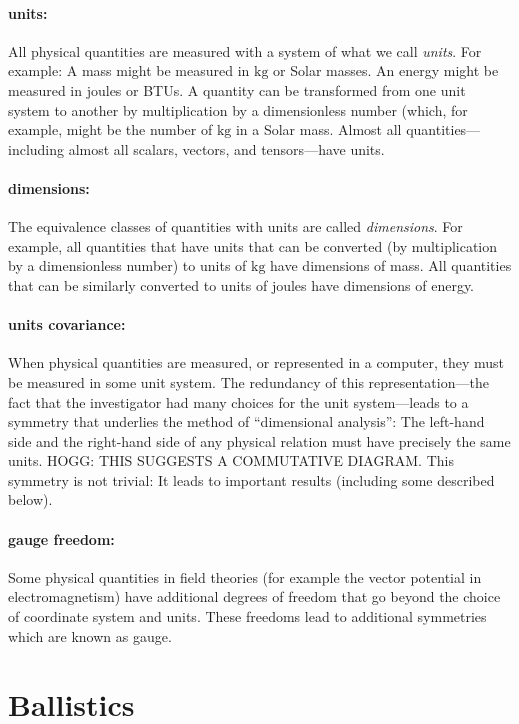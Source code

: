 \documentclass{article}
\newcommand{\unit}[1]{\mathrm{#1}}
\newcommand{\kg}{\unit{kg}}
\begin{document}
\paragraph{units:} All physical quantities are measured with a system of what we call \emph{units}.
For example: A mass might be measured in $\kg$ or Solar masses.
An energy might be measured in joules or BTUs.
A quantity can be transformed from one unit system to another by multiplication by a dimensionless number (which, for example, might be the number of $\kg$ in a Solar mass.
Almost all quantities---including almost all scalars, vectors, and tensors---have units.

\paragraph{dimensions:} The equivalence classes of quantities with units are called \emph{dimensions}.
For example, all quantities that have units that can be converted (by multiplication by a dimensionless number) to units of $\kg$ have dimensions of mass.
All quantities that can be similarly converted to units of joules have dimensions of energy.

\paragraph{units covariance:} When physical quantities are measured, or represented in a computer, they must be measured in some unit system.
The redundancy of this representation---the fact that the investigator had many choices for the unit system---leads to a symmetry that underlies the method of ``dimensional analysis'':
The left-hand side and the right-hand side of any physical relation must have precisely the same units.
HOGG: THIS SUGGESTS A COMMUTATIVE DIAGRAM.
This symmetry is not trivial: It leads to important results (including some described below).

\paragraph{gauge freedom:}
Some physical quantities in field theories (for example the vector potential in electromagnetism) have additional degrees of freedom that go beyond the choice of coordinate system and units.
These freedoms lead to additional symmetries which are known as gauge.

\section{Ballistics}
\end{document}

